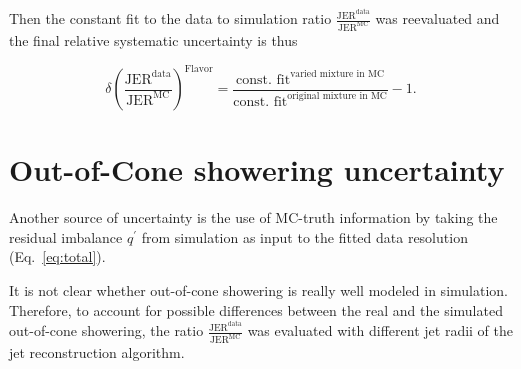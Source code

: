 Then the constant fit to the data to simulation ratio $\frac{\text{JER}^{\text{data}}}{\text{JER}^{\text{MC}}}$ was reevaluated and 
the final relative systematic uncertainty is thus 

\begin{equation}
\label{FlavorUncFINAL}
\delta \left( \frac{\text{JER}^{\text{data}}}{\text{JER}^{\text{MC}}} \right)^{\text{Flavor}} = \frac{\text{const. fit}^{\text{varied mixture in MC}}}{\text{const. fit}^{\text{original mixture in MC}}} - 1.
\end{equation}

\section*{Out-of-Cone showering uncertainty}
Another source of uncertainty is the use of MC-truth information by taking the residual imbalance $q^{\prime}$ from simulation as input to the fitted data resolution 
\mbox{(Eq.~\eqref{eq:total})}.

It is not clear whether out-of-cone showering is really well modeled in simulation. 
Therefore, to account for possible differences between the real and the simulated out-of-cone showering, the ratio $\frac{\text{JER}^{\text{data}}}{\text{JER}^{\text{MC}}}$ 
was evaluated with different jet radii of the jet reconstruction algorithm. 


